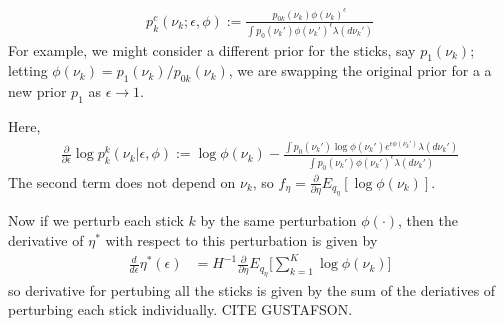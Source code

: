 \documentclass[a4paper]{article}
\begin{document}
\begin{align}
	\label{eq:expon_perturb}
	p^c_{k}(\nu_k ; \epsilon, \phi) :=
  \frac{p_{0k}(\nu_k)\phi(\nu_k)^\epsilon}{\int p_0(\nu_k')\phi(\nu_k')^\epsilon \lambda(d\nu_k')}
\end{align}
For example, we might consider a different prior for the sticks, say $p_1(\nu_k)$;
letting $\phi(\nu_k) = p_1(\nu_k) / p_{0k}(\nu_k)$,
we are swapping the original prior for a a new prior $p_1$ as $\epsilon \rightarrow 1$.

Here,
\begin{align}
  \frac{\partial}{\partial \epsilon} \log p_k^k(\nu_k | \epsilon, \phi) := \log \phi(\nu_k) -
    \frac{\int p_0(\nu_k')\log\phi(\nu_k')e^{\epsilon\phi(\nu_k')} \lambda(d\nu_k')}{\int p_0(\nu_k')\phi(\nu_k')^\epsilon \lambda(d\nu_k')}
\end{align}
The second term does not depend on $\nu_k$, so $f_\eta = \frac{\partial}{\partial \eta} E_{q_\eta}[\log \phi(\nu_k)]$.

Now if we perturb each stick $k$ by the same perturbation $\phi(\cdot)$, then
the derivative of $\eta^*$ with respect to this perturbation is given by
\begin{align}
   \frac{d}{d\epsilon}\eta^*(\epsilon) &=
   H^{-1}\frac{\partial}{\partial \eta} E_{q_\eta}\Big[\sum_{k = 1}^K \log \phi(\nu_k)\Big]
  \label{eq:sensitivity_exp_pert}
\end{align}
so derivative for pertubing all the sticks is given by the sum of the deriatives
of perturbing each stick individually. CITE GUSTAFSON.
\end{document}
